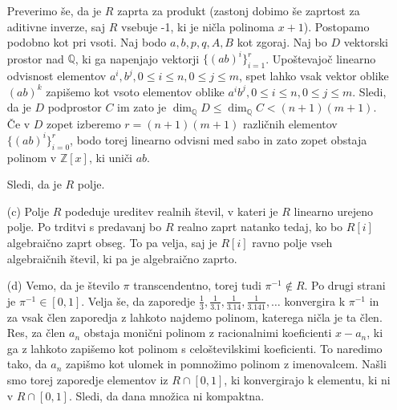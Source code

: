 \documentclass[a4paper, 12pt]{article}
\newcommand{\Z}{\mathbb{Z}}
\newcommand{\Q}{\mathbb{Q}}
\begin{document}
\begin{enumerate}
Preverimo še, da je $R$ zaprta za produkt (zastonj dobimo še zaprtost za aditivne inverze, saj $R$ vsebuje -1, ki je ničla polinoma $x+1$). Postopamo podobno kot pri vsoti. Naj bodo $a,b,p,q,A,B$ kot zgoraj. Naj bo $D$ vektorski prostor nad $\Q$, ki ga napenjajo vektorji $\{(ab)^i\}_{i=1}^r$. Upoštevajoč linearno odvisnost elementov $a^i, b^j, 0\le i \le n, 0\le j \le m$, spet lahko vsak vektor oblike $(ab)^k$ zapišemo kot vsoto elementov oblike $a^ib^j, 0\le i  \le n, 0\le j \le m$. Sledi, da je $D$ podprostor $C$ im zato je $\dim_{\Q}D \le \dim_{\Q}C < (n+1)(m+1)$. Če v $D$ zopet izberemo $r=(n+1)(m+1)$ različnih elementov $\{(ab)^i\}_{i=0}^r$, bodo torej linearno odvisni med sabo in zato zopet obstaja polinom v $\Z[x]$, ki uniči $ab$.

Sledi, da je $R$ polje.

\item[(c)] Polje $R$ podeduje ureditev realnih števil, v kateri je $R$ linearno urejeno polje. Po trditvi s predavanj bo $R$ realno zaprt  natanko tedaj, ko bo $R[i]$ algebraično zaprt obseg. To pa velja, saj je $R[i]$ ravno polje vseh algebraičnih števil, ki pa je algebraično zaprto.
\item[(d)] Vemo, da je število $\pi$ transcendentno, torej tudi $\pi^{-1} \notin R$. Po drugi strani je $\pi^{-1} \in [0,1]$. Velja še, da zaporedje $\frac{1}{3}, \frac{1}{3.1}, \frac{1}{3.14}, \frac{1}{3.141},\dots$ konvergira k $\pi^{-1}$ in za vsak člen zaporedja z lahkoto najdemo polinom, katerega ničla je ta člen. Res, za člen $a_n$ obstaja monični polinom z racionalnimi koeficienti $x-a_n$, ki ga z lahkoto zapišemo kot polinom s celoštevilskimi koeficienti. To naredimo tako, da $a_n$ zapišmo kot ulomek in pomnožimo polinom z imenovalcem. Našli smo torej zaporedje elementov iz $R\cap[0,1]$, ki konvergirajo k elementu, ki ni v $R\cap[0,1]$. Sledi, da dana množica ni kompaktna.
\end{enumerate}
\end{document}
